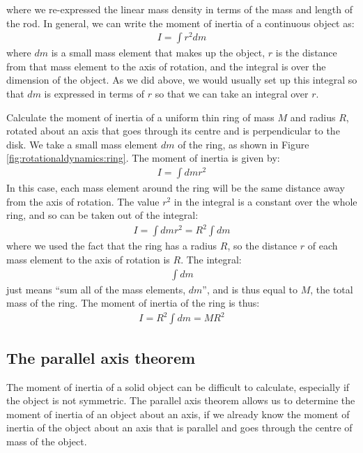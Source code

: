 where we re-expressed the linear mass density in terms of the mass and length of the rod. In general, we can write the moment of inertia of a continuous object as:
\begin{align*}
I = \int r^2 dm 
\end{align*}
where $dm$ is a small mass element that makes up the object, $r$ is the distance from that mass element to the axis of rotation, and the integral is over the dimension of the object. As we did above, we would usually set up this integral so that $dm$ is expressed in terms of $r$ so that we can take an integral over $r$. 

\begin{example}{\label{ex:rotationaldynamics:ring}Calculate the moment of inertia of a uniform thin ring of mass $M$ and radius $R$, rotated about an axis that goes through its centre and is perpendicular to the disk.}
We take a small mass element $dm$ of the ring, as shown in Figure \ref{fig:rotationaldynamics:ring}. 
The moment of inertia is given by:
\begin{align*}
I = \int dm r^2
\end{align*}
In this case, each mass element around the ring will be the same distance away from the axis of rotation. The value $r^2$ in the integral is a constant over the whole ring, and so can be taken out of the integral:
\begin{align*}
I = \int dm r^2 = R^2\int dm
\end{align*}
where we used the fact that the ring has a radius $R$, so the distance $r$ of each mass element to the axis of rotation is $R$. The integral:
\begin{align*}
\int dm
\end{align*}
just means ``sum all of the mass elements, $dm$'', and is thus equal to $M$, the total mass of the ring. The moment of inertia of the ring is thus:
\begin{align*}
I = R^2\int dm = MR^2
\end{align*}
\end{example}

\subsection{The parallel axis theorem}
The moment of inertia of a solid object can be difficult to calculate, especially if the object is not symmetric. The parallel axis theorem allows us to determine the moment of inertia of an object about an axis, if we already know the moment of inertia of the object about an axis that is parallel and goes through the centre of mass of the object.

